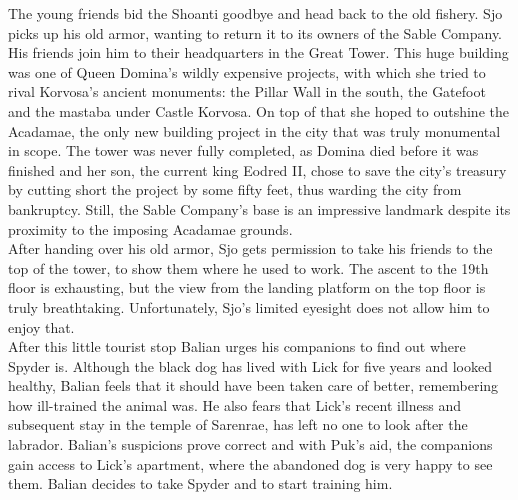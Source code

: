 The young friends bid the Shoanti goodbye and head back to the old fishery. Sjo picks up his old armor, wanting to return it to its owners of the Sable Company. His friends join him to their headquarters in the Great Tower. This huge building was one of Queen Domina's wildly expensive projects, with which she tried to rival Korvosa's ancient monuments: the Pillar Wall in the south, the Gatefoot and the mastaba under Castle Korvosa. On top of that she hoped to outshine the Acadamae, the only new building project in the city that was truly monumental in scope. The tower was never fully completed, as Domina died before it was finished and her son, the current king Eodred II, chose to save the city's treasury by cutting short the project by some fifty feet, thus warding the city from bankruptcy. Still, the Sable Company's base is an impressive landmark despite its proximity to the imposing Acadamae grounds.\\

After handing over his old armor, Sjo gets permission to take his friends to the top of the tower, to show them where he used to work. The ascent to the 19th floor is exhausting, but the view from the landing platform on the top floor is truly breathtaking. Unfortunately, Sjo's limited eyesight does not allow him to enjoy that.\\

After this little tourist stop Balian urges his companions to find out where Spyder is. Although the black dog has lived with Lick for five years and looked healthy, Balian feels that it should have been taken care of better, remembering how ill-trained the animal was. He also fears that Lick's recent illness and subsequent stay in the temple of Sarenrae, has left no one to look after the labrador. Balian's suspicions prove correct and with Puk's aid, the companions gain access to Lick's apartment, where the abandoned dog is very happy to see them. Balian decides to take Spyder and to start training him.\\

